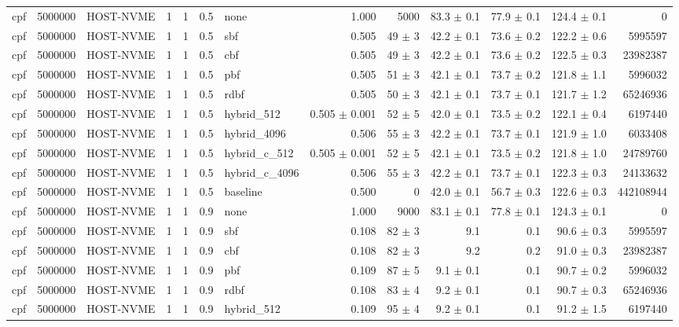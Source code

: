 \begin{tabular}{lllllllrrrrrr}
cpf & 5000000 & HOST-NVME & 1 & 1 & 0.5 & none & 1.000 & 5000 & 83.3 $\pm$ 0.1 & 77.9 $\pm$ 0.1 & 124.4 $\pm$ 0.1 & 0 \\
cpf & 5000000 & HOST-NVME & 1 & 1 & 0.5 & sbf & 0.505 & 49 $\pm$ 3 & 42.2 $\pm$ 0.1 & 73.6 $\pm$ 0.2 & 122.2 $\pm$ 0.6 & 5995597 \\
cpf & 5000000 & HOST-NVME & 1 & 1 & 0.5 & cbf & 0.505 & 49 $\pm$ 3 & 42.2 $\pm$ 0.1 & 73.6 $\pm$ 0.2 & 122.5 $\pm$ 0.3 & 23982387 \\
cpf & 5000000 & HOST-NVME & 1 & 1 & 0.5 & pbf & 0.505 & 51 $\pm$ 3 & 42.1 $\pm$ 0.1 & 73.7 $\pm$ 0.2 & 121.8 $\pm$ 1.1 & 5996032 \\
cpf & 5000000 & HOST-NVME & 1 & 1 & 0.5 & rdbf & 0.505 & 50 $\pm$ 3 & 42.1 $\pm$ 0.1 & 73.7 $\pm$ 0.1 & 121.7 $\pm$ 1.2 & 65246936 \\
cpf & 5000000 & HOST-NVME & 1 & 1 & 0.5 & hybrid\_512 & 0.505 $\pm$ 0.001 & 52 $\pm$ 5 & 42.0 $\pm$ 0.1 & 73.5 $\pm$ 0.2 & 122.1 $\pm$ 0.4 & 6197440 \\
cpf & 5000000 & HOST-NVME & 1 & 1 & 0.5 & hybrid\_4096 & 0.506 & 55 $\pm$ 3 & 42.2 $\pm$ 0.1 & 73.7 $\pm$ 0.1 & 121.9 $\pm$ 1.0 & 6033408 \\
cpf & 5000000 & HOST-NVME & 1 & 1 & 0.5 & hybrid\_c\_512 & 0.505 $\pm$ 0.001 & 52 $\pm$ 5 & 42.1 $\pm$ 0.1 & 73.5 $\pm$ 0.2 & 121.8 $\pm$ 1.0 & 24789760 \\
cpf & 5000000 & HOST-NVME & 1 & 1 & 0.5 & hybrid\_c\_4096 & 0.506 & 55 $\pm$ 3 & 42.2 $\pm$ 0.1 & 73.7 $\pm$ 0.1 & 122.3 $\pm$ 0.3 & 24133632 \\
cpf & 5000000 & HOST-NVME & 1 & 1 & 0.5 & baseline & 0.500 & 0 & 42.0 $\pm$ 0.1 & 56.7 $\pm$ 0.3 & 122.6 $\pm$ 0.3 & 442108944 \\
cpf & 5000000 & HOST-NVME & 1 & 1 & 0.9 & none & 1.000 & 9000 & 83.1 $\pm$ 0.1 & 77.8 $\pm$ 0.1 & 124.3 $\pm$ 0.1 & 0 \\
cpf & 5000000 & HOST-NVME & 1 & 1 & 0.9 & sbf & 0.108 & 82 $\pm$ 3 & 9.1 & 0.1 & 90.6 $\pm$ 0.3 & 5995597 \\
cpf & 5000000 & HOST-NVME & 1 & 1 & 0.9 & cbf & 0.108 & 82 $\pm$ 3 & 9.2 & 0.2 & 91.0 $\pm$ 0.3 & 23982387 \\
cpf & 5000000 & HOST-NVME & 1 & 1 & 0.9 & pbf & 0.109 & 87 $\pm$ 5 & 9.1 $\pm$ 0.1 & 0.1 & 90.7 $\pm$ 0.2 & 5996032 \\
cpf & 5000000 & HOST-NVME & 1 & 1 & 0.9 & rdbf & 0.108 & 83 $\pm$ 4 & 9.2 $\pm$ 0.1 & 0.1 & 90.7 $\pm$ 0.3 & 65246936 \\
cpf & 5000000 & HOST-NVME & 1 & 1 & 0.9 & hybrid\_512 & 0.109 & 95 $\pm$ 4 & 9.2 $\pm$ 0.1 & 0.1 & 91.2 $\pm$ 1.5 & 6197440 \\

\end{tabular}
